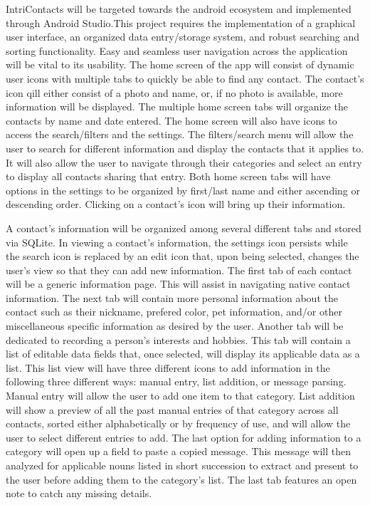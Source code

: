\documentclass[man, 11pt, a4paper, biblatex]{apa6}
\begin{document}
  IntriContacts will be targeted towards the android ecosystem and implemented through Android Studio.This project requires the implementation of a graphical user interface, an organized data entry/storage system, and robust searching and sorting functionality. Easy and seamless user navigation across the application will be vital to its usability. The home screen of the app will consist of dynamic user icons with multiple tabs to quickly be able to find any contact. The contact's icon qill either consist of a photo and name, or, if no photo is available, more information will be displayed. The multiple home screen tabs will organize the contacts by name and date entered. The home screen will also have icons to access the search/filters and the settings. The filters/search menu will allow the user to search for different information and display the contacts that it applies to. It will also allow the user to navigate through their categories and select an entry to display all contacts sharing that entry. Both home screen tabs will have options in the settings to be organized by first/last name and either ascending or descending order. Clicking on a contact's icon will bring up their information.

  A contact's information will be organized among several different tabs and stored via SQLite. In viewing a contact's information, the settings icon persists while the search icon is replaced by an edit icon that, upon being selected, changes the user's view so that they can add new information. The first tab of each contact will be a generic information page. This will assist in navigating native contact information. The next tab will contain more personal information about the contact such as their nickname, prefered color, pet information, and/or other miscellaneous specific information as desired by the user. Another tab will be dedicated to recording a person's interests and hobbies. This tab will contain a list of editable data fields that, once selected, will display its applicable data as a list. This list view will have three different icons to add information in the following three different ways: manual entry, list addition, or message parsing. Manual entry will allow the user to add one item to that category. List addition will show a preview of all the past manual entries of that category across all contacts, sorted either alphabetically or by frequency of use, and will allow the user to select different entries to add. The last option for adding information to a category will open up a field to paste a copied message. This message will then analyzed for applicable nouns listed in short succession to extract and present to the user before adding them to the category's list. The last tab features an open note to catch any missing details.
\end{document}
